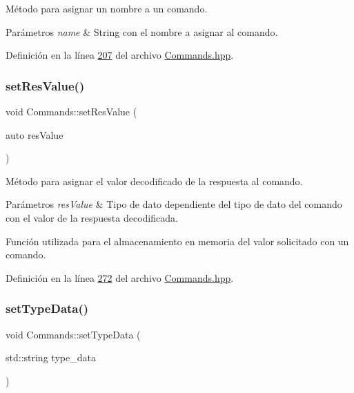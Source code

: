 Método para asignar un nombre a un comando. 


\begin{DoxyParams}{Parámetros}
{\em name} & String con el nombre a asignar al comando. \\
\hline
\end{DoxyParams}


Definición en la línea \hyperlink{Commands_8hpp_source_l00207}{207} del archivo \hyperlink{Commands_8hpp_source}{Commands.\+hpp}.

\mbox{\label{classCommands_a5c8eb30ed986a5071daf5f1135c2eb15}} 
\subsubsection{\texorpdfstring{set\+Res\+Value()}{setResValue()}}
{\footnotesize\ttfamily void Commands\+::set\+Res\+Value (\begin{DoxyParamCaption}\item[{auto}]{res\+Value }\end{DoxyParamCaption})\hspace{0.3cm}{\ttfamily [inline]}}



Método para asignar el valor decodificado de la respuesta al comando. 


\begin{DoxyParams}{Parámetros}
{\em res\+Value} & Tipo de dato dependiente del tipo de dato del comando con el valor de la respuesta decodificada.\\
\hline
\end{DoxyParams}
Función utilizada para el almacenamiento en memoria del valor solicitado con un comando. 

Definición en la línea \hyperlink{Commands_8hpp_source_l00272}{272} del archivo \hyperlink{Commands_8hpp_source}{Commands.\+hpp}.

\mbox{\label{classCommands_a1b2c552b493828ef9465d153809be3f2}} 
\subsubsection{\texorpdfstring{set\+Type\+Data()}{setTypeData()}}
{\footnotesize\ttfamily void Commands\+::set\+Type\+Data (\begin{DoxyParamCaption}\item[{std\+::string}]{type\+\_\+data }\end{DoxyParamCaption})\hspace{0.3cm}{\ttfamily [inline]}}



